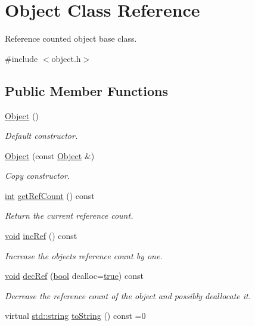 \hypertarget{class_object}{}\section{Object Class Reference}
\label{class_object}


Reference counted object base class.  




{\ttfamily \#include $<$object.\+h$>$}

\subsection*{Public Member Functions}
\begin{DoxyCompactItemize}
\item 
\mbox{\hyperlink{class_object_a40860402e64d8008fb42329df7097cdb}{Object}} ()
\begin{DoxyCompactList}\small\item\em Default constructor. \end{DoxyCompactList}\item 
\mbox{\hyperlink{class_object_af3b5cd7a9a24ddde484344200cf83281}{Object}} (const \mbox{\hyperlink{class_object}{Object}} \&)
\begin{DoxyCompactList}\small\item\em Copy constructor. \end{DoxyCompactList}\item 
\mbox{\hyperlink{warnings_8h_a74f207b5aa4ba51c3a2ad59b219a423b}{int}} \mbox{\hyperlink{class_object_a4f97f143f9fb46ac52e2f11cfa034005}{get\+Ref\+Count}} () const
\begin{DoxyCompactList}\small\item\em Return the current reference count. \end{DoxyCompactList}\item 
\mbox{\hyperlink{_s_d_l__opengles2__gl2ext_8h_ae5d8fa23ad07c48bb609509eae494c95}{void}} \mbox{\hyperlink{class_object_a769b55a36d5a2d42af6ef37be0789f43}{inc\+Ref}} () const
\begin{DoxyCompactList}\small\item\em Increase the object\textquotesingle{}s reference count by one. \end{DoxyCompactList}\item 
\mbox{\hyperlink{_s_d_l__opengles2__gl2ext_8h_ae5d8fa23ad07c48bb609509eae494c95}{void}} \mbox{\hyperlink{class_object_aee1171037ab2f9137ff9864ceb8f3086}{dec\+Ref}} (\mbox{\hyperlink{asdl_8h_af6a258d8f3ee5206d682d799316314b1}{bool}} dealloc=\mbox{\hyperlink{asdl_8h_af6a258d8f3ee5206d682d799316314b1a08f175a5505a10b9ed657defeb050e4b}{true}}) const
\begin{DoxyCompactList}\small\item\em Decrease the reference count of the object and possibly deallocate it. \end{DoxyCompactList}\item 
virtual \mbox{\hyperlink{_s_d_l__opengl__glext_8h_ab4ccfaa8ab0e1afaae94dc96ef52dde1}{std\+::string}} \mbox{\hyperlink{class_object_a89fee2453b0e7b4737afac15cf8ed039}{to\+String}} () const =0
\end{DoxyCompactItemize}
